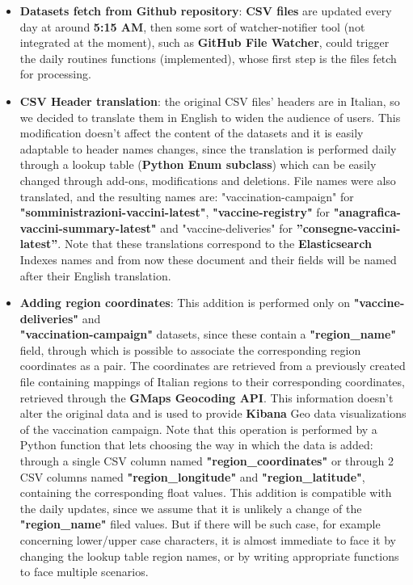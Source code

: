 \documentclass{article}[IEEEtran]
\begin{document}
\begin{itemize}
    \item \textbf{Datasets fetch from Github repository}: \textbf{CSV files} are updated every day at around \textbf{5:15 AM}, then some sort of watcher-notifier tool (not integrated at the moment), such as \textbf{GitHub File Watcher}\cite{b6}, could trigger the daily routines functions (implemented), whose first step is the files fetch for processing.
    
    \item \textbf{CSV Header translation}: the original CSV files' headers are in Italian, so we decided to translate them in English to widen the audience of users. This modification doesn't affect the content of the datasets and it is easily adaptable to header names changes, since the translation is performed daily through a lookup table (\textbf{Python Enum subclass}) which can be easily changed through add-ons, modifications and deletions.
    File names were also translated, and the resulting names are: "vaccination-campaign" for \textbf{"somministrazioni-vaccini-latest"}, \textbf{"vaccine-registry"} for \textbf{"anagrafica-vaccini-summary-latest"} and "vaccine-deliveries" for  \textbf{”consegne-vaccini-latest”}. Note that these translations correspond to the \textbf{Elasticsearch}\cite{b3} Indexes names and from now these document and their fields will be named after their English translation.
    
    \item \textbf{Adding region coordinates}: This addition is performed only on \textbf{"vaccine-deliveries"} and \\ \textbf{"vaccination-campaign"} datasets, since these contain a \textbf{"region\_name"} field, through which is possible to associate the corresponding region coordinates as a pair. The coordinates are retrieved from a previously created file containing mappings of Italian regions to their corresponding coordinates, retrieved through the \textbf{GMaps Geocoding API}\cite{b1}. This information doesn't alter the original data and is used to provide \textbf{Kibana} Geo data visualizations of the vaccination campaign. Note that this operation is performed by a Python function that lets choosing the way in which the data is added: through a single CSV column named \textbf{"region\_coordinates"} or through 2 CSV columns named \textbf{"region\_longitude"} and \textbf{"region\_latitude"}, containing the corresponding float values.
    This addition is compatible with the daily updates, since we assume that it is unlikely a change of the \textbf{"region\_name"} filed values. But if there will be such case, for example concerning lower/upper case characters, it is almost immediate to face it by changing the lookup table region names, or by writing appropriate functions to face multiple scenarios.
    

\end{itemize}
\end{document}
